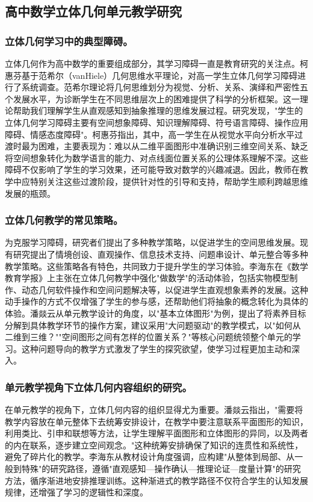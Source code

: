 \documentclass[UTF8,a4paper,12pt,twoside]{ctexart}
\begin{document}
\subsection{高中数学立体几何单元教学研究}

\subsubsection{立体几何学习中的典型障碍。}
立体几何作为高中数学的重要组成部分，其学习障碍一直是教育研究的关注点。柯惠芬\cite{ke2025}基于范希尔（vanHiele）几何思维水平理论，对高一学生立体几何学习障碍进行了系统调查。范希尔理论将几何思维划分为视觉、分析、关系、演绎和严密性五个发展水平，为诊断学生在不同思维层次上的困难提供了科学的分析框架。这一理论帮助我们理解学生从直观感知到抽象推理的思维发展过程。研究发现，"学生的立体几何学习障碍主要有空间想象障碍、知识理解障碍、符号语言障碍、操作应用障碍、情感态度障碍"。柯惠芬\cite{ke2025}指出，其中，高一学生在从视觉水平向分析水平过渡时最为困难，主要表现为：难以从二维平面图形中准确识别三维空间关系、缺乏将空间想象转化为数学语言的能力、对点线面位置关系的公理体系理解不深。这些障碍不仅影响了学生的学习效果，还可能导致对数学的兴趣减退。因此，教师在教学中应特别关注这些过渡阶段，提供针对性的引导和支持，帮助学生顺利跨越思维发展的瓶颈。

\subsubsection{立体几何教学的常见策略。}
为克服学习障碍，研究者们提出了多种教学策略，以促进学生的空间思维发展。现有研究提出了情境创设、直观操作、信息技术支持、问题串设计、单元整合等多种教学策略。这些策略各有特色，共同致力于提升学生的学习体验。李海东\cite{li2019}在《数学教育学报》上主张在立体几何教学中强化"做数学"的活动体验，包括实物模型制作、动态几何软件操作和空间问题解决等，以促进学生直观想象素养的发展。这种动手操作的方式不仅增强了学生的参与感，还帮助他们将抽象的概念转化为具体的体验。潘燚云\cite{pan2025}从单元教学设计的角度，以"基本立体图形"为例，提出了将素养目标分解到具体教学环节的操作方案，建议采用"大问题驱动"的教学模式，以"如何从二维到三维？""空间图形之间有怎样的位置关系？"等核心问题统领整个单元的学习。这种问题导向的教学方式激发了学生的探究欲望，使学习过程更加主动和深入。

\subsubsection{单元教学视角下立体几何内容组织的研究。}
在单元教学的视角下，立体几何内容的组织显得尤为重要。潘燚云\cite{pan2025}指出，"需要将教学内容放在单元整体下去统筹安排设计，在教学中要注意联系平面图形的知识，利用类比、引申和联想等方法，让学生理解平面图形和立体图形的异同，以及两者的内在联系，逐步建立空间观念。"这种统筹安排确保了知识的连贯性和系统性，避免了碎片化的教学。李海东\cite{li2019}从教材设计角度强调，应构建"从整体到局部、从一般到特殊"的研究路径，遵循"直观感知—操作确认—推理论证—度量计算"的研究方法，循序渐进地安排推理训练。这种渐进式的教学路径不仅符合学生的认知发展规律，还增强了学习的逻辑性和深度。
\end{document}
